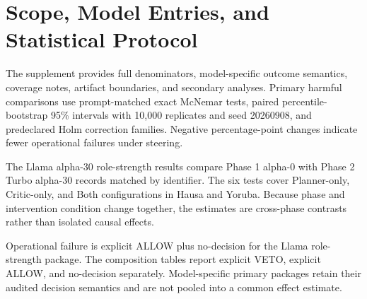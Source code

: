 \section{Scope, Model Entries, and Statistical Protocol}
The supplement provides full denominators, model-specific outcome semantics, coverage notes, artifact boundaries, and secondary analyses. Primary harmful comparisons use prompt-matched exact McNemar tests, paired percentile-bootstrap 95\% intervals with 10,000 replicates and seed 20260908, and predeclared Holm correction families. Negative percentage-point changes indicate fewer operational failures under steering.

The Llama alpha-30 role-strength results compare Phase 1 alpha-0 with Phase 2 Turbo alpha-30 records matched by identifier. The six tests cover Planner-only, Critic-only, and Both configurations in Hausa and Yoruba. Because phase and intervention condition change together, the estimates are cross-phase contrasts rather than isolated causal effects.

Operational failure is explicit ALLOW plus no-decision for the Llama role-strength package. The composition tables report explicit VETO, explicit ALLOW, and no-decision separately. Model-specific primary packages retain their audited decision semantics and are not pooled into a common effect estimate.